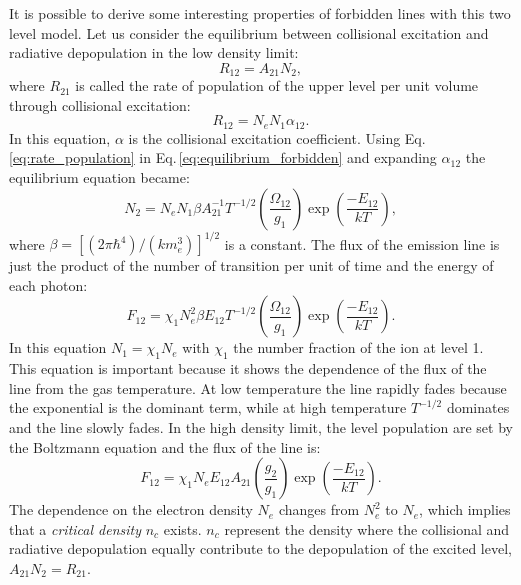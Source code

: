 \documentclass[../main.tex]{subfiles}
\begin{document}
It is possible to derive some interesting properties of forbidden lines with this two level model.
Let us consider the equilibrium between collisional excitation and radiative depopulation in the low density limit:
\begin{equation}
    \label{eq:equilibrium_forbidden}
    R_{12} = A_{21}N_2,
\end{equation} 
where $R_{21}$ is called the rate of population of the upper level per unit volume through collisional excitation:
\begin{equation}
    \label{eq:rate_population}
    R_{12} = N_eN_1 \alpha_{12}.
\end{equation}
In this equation, $\alpha$ is the collisional excitation coefficient.
Using Eq.\,\ref{eq:rate_population} in Eq.\,\ref{eq:equilibrium_forbidden} and expanding $\alpha_{12}$ the equilibrium equation became:
\begin{equation}
    \label{eq:equilibrium_forbidden2}
    N_2 = N_e N_1 \beta A_{21}^{-1}T^{-1/2}\left(\frac{\Omega_{12}}{g_1}\right)\exp\left(\frac{-E_{12}}{kT}\right),
\end{equation}
where $\beta = [(2\pi \hbar^4)/(km_e^3)]^{1/2}$ is a constant.
The flux of the emission line is just the product of the number of transition per unit of time and the energy of each photon:
\begin{equation}
    \label{eq:flux}
    F_{12} = \chi_1 N_e^2 \beta E_{12} T^{-1/2} \left(\frac{\Omega_{12}}{g_1}\right) \exp\left(\frac{-E_{12}}{kT}\right).
\end{equation}
In this equation $N_1 = \chi_1N_e$ with $\chi_1$ the number fraction of the ion at level 1.
This equation is important because it shows the dependence of the flux of the line from the gas temperature.
At low temperature the line rapidly fades because the exponential is the dominant term, while at high temperature $T^{-1/2}$ dominates and the line slowly fades.
In the high density limit, the level population are set by the Boltzmann equation and the flux of the line is:
\begin{equation}
    \label{eq:flux_boltz}
    F_{12} = \chi_1 N_e E_{12} A_{21} \left(\frac{g_2}{g_1}\right) \exp\left(\frac{-E_{12}}{kT}\right).
\end{equation}
The dependence on the electron density $N_e$ changes from $N_e^2$ to $N_e$, which implies that a \emph{critical density} $n_c$ exists. 
$n_c$ represent the density where the collisional and radiative depopulation equally contribute to the depopulation of the excited level,  $A_{21} N_2 = R_{21}$.
\end{document}
